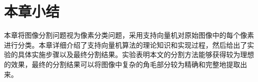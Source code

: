 \section{本章小结}
本章将图像分割问题视为像素分类问题，采用支持向量机对原始图像中的每个像素进行分类。本章详细介绍了支持向量机算法的理论知识和实现过程，然后给出了实验的具体实施步骤以及最终分割结果。实验表明本文的分割方法能够获得较为理想的效果，最终的分割结果可以将图像中复杂的角毛部分较为精确和完整地提取出来。

 
